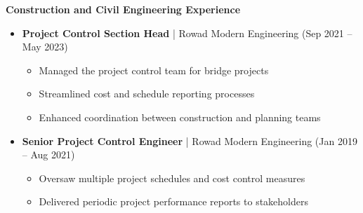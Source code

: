 \documentclass[10pt, letterpaper]{article}
\begin{document}
\begin{mdframed}[style=cvframe]
\begin{multicols}{2}
\textbf{\textcolor{primaryColor}{Construction and Civil Engineering Experience}}
\begin{itemize}[leftmargin=*]
    \item \textbf{Project Control Section Head} | Rowad Modern Engineering (Sep 2021 -- May 2023)
    \begin{itemize}[leftmargin=1cm]
        \item Managed the project control team for bridge projects
        \item Streamlined cost and schedule reporting processes
        \item Enhanced coordination between construction and planning teams
    \end{itemize}
    
    \item \textbf{Senior Project Control Engineer} | Rowad Modern Engineering (Jan 2019 -- Aug 2021)
    \begin{itemize}[leftmargin=1cm]
        \item Oversaw multiple project schedules and cost control measures
        \item Delivered periodic project performance reports to stakeholders
    \end{itemize}
\end{itemize}
\end{multicols}
\end{mdframed}

\clearpage  %
\end{document}
